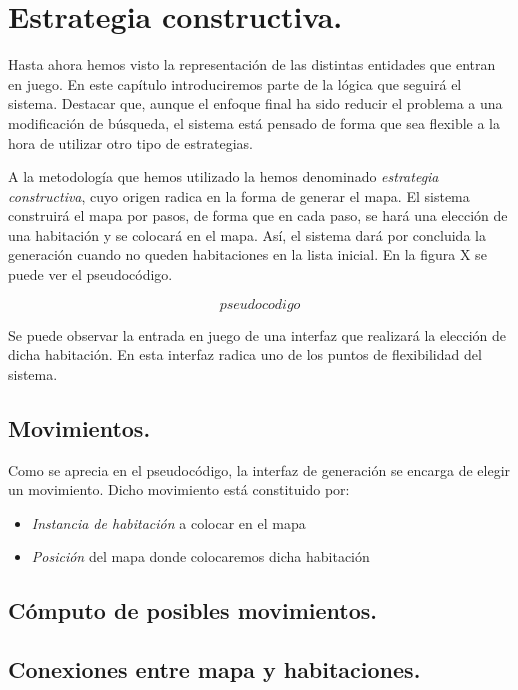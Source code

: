 \chapter{Estrategia constructiva.}\label{cap:capitulo4}

Hasta ahora hemos visto la representación de las distintas entidades que entran en juego. En este capítulo introduciremos parte de la lógica que seguirá el sistema. Destacar que, aunque el enfoque final ha sido reducir el problema a una modificación de búsqueda, el sistema está pensado de forma que sea flexible a la hora de utilizar otro tipo de estrategias.

A la metodología que hemos utilizado la hemos denominado \emph{estrategia constructiva}, cuyo origen radica en la forma de generar el mapa. El sistema construirá el mapa por pasos, de forma que en cada paso, se hará una elección de una habitación y se colocará en el mapa. Así, el sistema dará por concluida la generación cuando no queden habitaciones en la lista inicial. En la figura X se puede ver el pseudocódigo.

$$ pseudocodigo $$

Se puede observar la entrada en juego de una interfaz que realizará la elección de dicha habitación. En esta interfaz radica uno de los puntos de flexibilidad del sistema.

\section{Movimientos.}

Como se aprecia en el pseudocódigo, la interfaz de generación se encarga de elegir un movimiento. Dicho movimiento está constituido por:

\begin{itemize}
	\item\emph{Instancia de habitación} a colocar en el mapa
	\item\emph{Posición} del mapa donde colocaremos dicha habitación
\end{itemize}

\section{Cómputo de posibles movimientos.}


\section{Conexiones entre mapa y habitaciones.}



